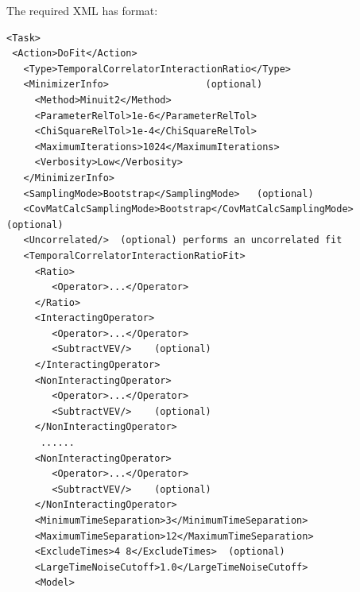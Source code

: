 \documentclass[12pt]{article}
\begin{document}
The required XML has format:
\begin{verbatim}
<Task>                                                                   
 <Action>DoFit</Action>                                                  
   <Type>TemporalCorrelatorInteractionRatio</Type>                       
   <MinimizerInfo>                 (optional)                            
     <Method>Minuit2</Method>                                            
     <ParameterRelTol>1e-6</ParameterRelTol>                             
     <ChiSquareRelTol>1e-4</ChiSquareRelTol>                             
     <MaximumIterations>1024</MaximumIterations>                         
     <Verbosity>Low</Verbosity>                                          
   </MinimizerInfo>                                                      
   <SamplingMode>Bootstrap</SamplingMode>   (optional)                   
   <CovMatCalcSamplingMode>Bootstrap</CovMatCalcSamplingMode> (optional) 
   <Uncorrelated/>  (optional) performs an uncorrelated fit              
   <TemporalCorrelatorInteractionRatioFit>                               
     <Ratio>                                                             
        <Operator>...</Operator>                                         
     </Ratio>                                                            
     <InteractingOperator>                                               
        <Operator>...</Operator>                                         
        <SubtractVEV/>    (optional)                                    
     </InteractingOperator>                                              
     <NonInteractingOperator>                                            
        <Operator>...</Operator>                                         
        <SubtractVEV/>    (optional)                                    
     </NonInteractingOperator>                                           
      ......                                                             
     <NonInteractingOperator>                                            
        <Operator>...</Operator>                                         
        <SubtractVEV/>    (optional)                                    
     </NonInteractingOperator>                                           
     <MinimumTimeSeparation>3</MinimumTimeSeparation>                    
     <MaximumTimeSeparation>12</MaximumTimeSeparation>                   
     <ExcludeTimes>4 8</ExcludeTimes>  (optional)                        
     <LargeTimeNoiseCutoff>1.0</LargeTimeNoiseCutoff>                    
     <Model>                                                             

\end{verbatim}
\end{document}
